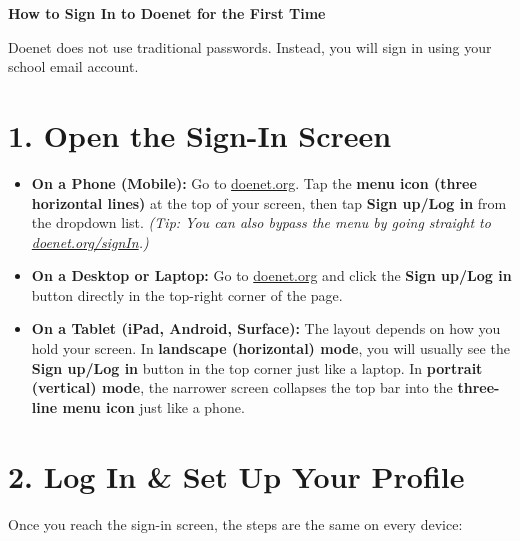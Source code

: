 \documentclass[11pt, letterpaper]{article}
\begin{document}
\begin{center}
    {\Large \textbf{How to Sign In to Doenet for the First Time}}
\end{center}

\vspace{0.5em}

Doenet does not use traditional passwords. Instead, you will sign in using your school email account.


\section*{1. Open the Sign-In Screen}

\begin{itemize}[leftmargin=1.5em, itemsep=0.5em]
    \item \textbf{On a Phone (Mobile):} Go to \href{https://doenet.org}{doenet.org}. Tap the \textbf{menu icon (three horizontal lines)} at the top of your screen, then tap \textbf{Sign up/Log in} from the dropdown list. \textit{(Tip: You can also bypass the menu by going straight to \href{https://doenet.org/signIn}{doenet.org/signIn}.)}
    
    \item \textbf{On a Desktop or Laptop:} Go to \href{https://doenet.org}{doenet.org} and click the \textbf{Sign up/Log in} button directly in the top-right corner of the page.
    
    \item \textbf{On a Tablet (iPad, Android, Surface):} The layout depends on how you hold your screen. In \textbf{landscape (horizontal) mode}, you will usually see the \textbf{Sign up/Log in} button in the top corner just like a laptop. In \textbf{portrait (vertical) mode}, the narrower screen collapses the top bar into the \textbf{three-line menu icon} just like a phone.
\end{itemize}

\section*{2. Log In \& Set Up Your Profile}

Once you reach the sign-in screen, the steps are the same on every device:
\end{document}
